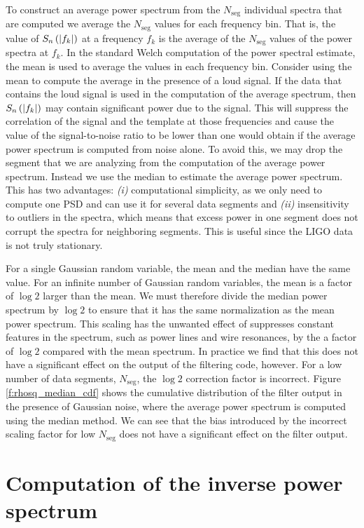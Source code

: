 To construct an average power spectrum from the $N_\mathrm{seg}$ individual
spectra that are computed we average the $N_\mathrm{seg}$ values for each
frequency bin. That is, the value of $S_n\left(\left|f_{k}\right|\right)$ at a frequency $f_k$ is the
average of the $N_\mathrm{seg}$ values of the power spectra at $f_k$. In the
standard Welch computation of the power spectral estimate, the mean is used to
average the values in each frequency bin.  Consider using the mean to compute
the average in the presence of a loud signal. If the data that contains the
loud signal is used in the computation of the average spectrum, then $S_n\left(\left|f_{k}\right|\right)$
may contain significant power due to the signal. This will suppress the
correlation of the signal and the template at those frequencies and cause the
value of the signal-to-noise ratio to be lower than one would obtain if the
average power spectrum is computed from noise alone.  To avoid this, we may
drop the segment that we are analyzing from the computation of the average
power spectrum.  Instead we use the median to estimate the
average power spectrum. This has two advantages: \emph{(i)} computational
simplicity, as we only need to compute one PSD and can use it for several data
segments and \emph{(ii)} insensitivity to outliers in the spectra, which means
that excess power in one segment does not corrupt the spectra for neighboring
segments. This is useful since the LIGO data is not truly stationary.

For a single Gaussian random variable, the mean and the median have the same
value. For an infinite number of Gaussian random variables, the mean is a
factor of $\log 2$ larger than the mean. We must therefore divide the median
power spectrum by $\log 2$ to ensure that it has the same normalization as the
mean power spectrum. This scaling has the unwanted effect of suppresses
constant features in the spectrum, such as power lines and wire resonances, by
the a factor of $\log 2$ compared with the mean spectrum. In practice we find
that this does not have a significant effect on the output of the filtering
code, however.  For a low number of data segments, $N_\mathrm{seg}$, the $\log
2$ correction factor is incorrect. Figure \ref{f:rhosq_median_cdf} shows the
cumulative distribution of the filter output in the presence of Gaussian
noise, where the average power spectrum is computed using the median method.
We can see that the bias introduced by the incorrect scaling factor for low 
$N_\mathrm{seg}$ does not have a significant effect on the filter output.

\section{Computation of the inverse power spectrum}
\label{ss:invspec}

